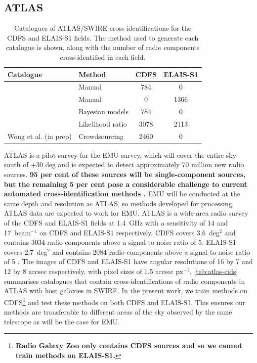 \documentclass[fleqn,usenatbib,usedcolumn]{mnras}
\newcommand{\jansky}{\text{Jy}}
\newcommand{\edited}[1]{{\bf {#1}}}
\begin{document}
  \subsection{ATLAS}\label{sec:atlas}
    \begin{table}
      \caption{Catalogues of ATLAS/SWIRE cross-identifications for the CDFS
        and ELAIS-S1 fields. The method used to generate each catalogue is
        shown, along with the number of radio components cross-identified in each
        field.}
      \label{tab:atlas-cids}
      \begin{tabular}{llcc}
        \hline
        Catalogue & Method & CDFS & ELAIS-S1\\
        \hline
        \citet{norris06} & Manual & 784 & 0\\
        \citet{middelberg08} & Manual & 0 & 1366\\
        \citet{fan15} & Bayesian models & 784 & 0\\
        \citet{weston18lrpy} & Likelihood ratio & 3078 & 2113\\
        Wong et al. (in prep) & Crowdsourcing & 2460 & 0 \\
        \hline
      \end{tabular}
    \end{table}

    ATLAS is a pilot survey for the EMU \citep{norris11} survey, which will
    cover the entire sky south of $+30$ deg and is expected to detect
    approximately 70 million new radio sources. \edited{95 per cent of these sources
    will be single-component sources, but the remaining 5 per cent pose a
    considerable challenge to current automated cross-identification methods
    \citep{norris11}.} EMU will be conducted at the same depth and resolution
    as ATLAS, so methods developed for processing ATLAS data are expected to
    work for EMU. ATLAS is a wide-area radio survey of the CDFS and ELAIS-S1
    fields at 1.4~GHz with a sensitivity of 14 and
    \unit{17}{\micro\jansky}~beam$^{-1}$ on CDFS and ELAIS-S1 respectively.
    CDFS covers 3.6~deg$^2$ and contains 3034 radio components above a
    signal-to-noise ratio of 5. ELAIS-S1 covers 2.7~deg$^2$ and contains 2084
    radio components above a signal-to-noise ratio of 5 \citep{franzen15}. The
    images of CDFS and ELAIS-S1 have angular resolutions of 16 by 7 and 12 by
    8 arcsec respectively, with pixel sizes of 1.5 arcsec px$^{-1}$.
    \autoref{tab:atlas-cids} summarises catalogues that contain
    cross-identifications of radio components in ATLAS with host galaxies in
    SWIRE. In the present work, we train methods on
    CDFS\footnote{\edited{Radio Galaxy Zoo only contains CDFS sources and so
    we cannot train methods on ELAIS-S1.}} and test these methods on both CDFS
    and ELAIS-S1. This ensures our methods are transferable to different
    areas of the sky observed by the same telescope as will be the case for
    EMU.
\end{document}
